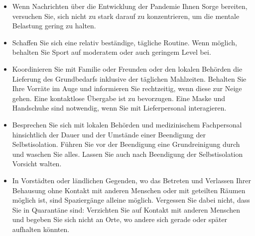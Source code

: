 \documentclass{article}
\begin{document}
\begin{itemize}
\item Wenn Nachrichten über die Entwicklung der Pandemie Ihnen Sorge bereiten, versuchen Sie, sich nicht zu stark darauf zu konzentrieren, um die mentale Belastung gering zu halten.
\item Schaffen Sie sich eine relativ beständige, tägliche Routine. Wenn möglich, behalten Sie Sport auf moderatem oder auch geringem Level bei.
\item Koordinieren Sie mit Familie oder Freunden oder den lokalen Behörden die Lieferung des Grundbedarfs inklusive der täglichen Mahlzeiten. Behalten Sie Ihre Vorräte im Auge und informieren Sie rechtzeitig, wenn diese zur Neige gehen. Eine kontaktlose Übergabe ist zu bevorzugen. Eine Maske und Handschuhe sind notwendig, wenn Sie mit Lieferpersonal interagieren.
\item Besprechen Sie sich mit lokalen Behörden und medizinischem Fachpersonal hinsichtlich der Dauer und der Umstände einer Beendigung der Selbstisolation. Führen Sie vor der Beendigung eine Grundreinigung durch und waschen Sie alles. Lassen Sie auch nach Beendigung der Selbstisolation Vorsicht walten.
\item In Vorstädten oder ländlichen Gegenden, wo das Betreten und Verlassen Ihrer Behausung ohne Kontakt mit anderen Menschen oder mit geteilten Räumen möglich ist, sind Spaziergänge alleine möglich. Vergessen Sie dabei nicht, dass Sie in Quarantäne sind: Verzichten Sie auf Kontakt mit anderen Menschen und begeben Sie sich nicht an Orte, wo andere sich gerade oder später aufhalten könnten.
\end{itemize}
  
  
  
\end{document}
